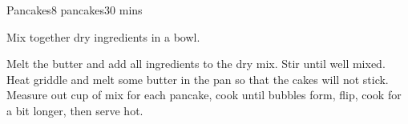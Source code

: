 \begin{recipe}{Pancakes}{8 pancakes}{30 mins}





  Mix together dry ingredients in a bowl.

  




  Melt the butter and add all ingredients to the dry mix.  Stir until well
  mixed.  Heat griddle and melt some butter in the pan so that the cakes will
  not stick.  Measure out  cup of mix for each pancake, cook
  until bubbles form, flip, cook for a bit longer, then serve hot.

\end{recipe}
